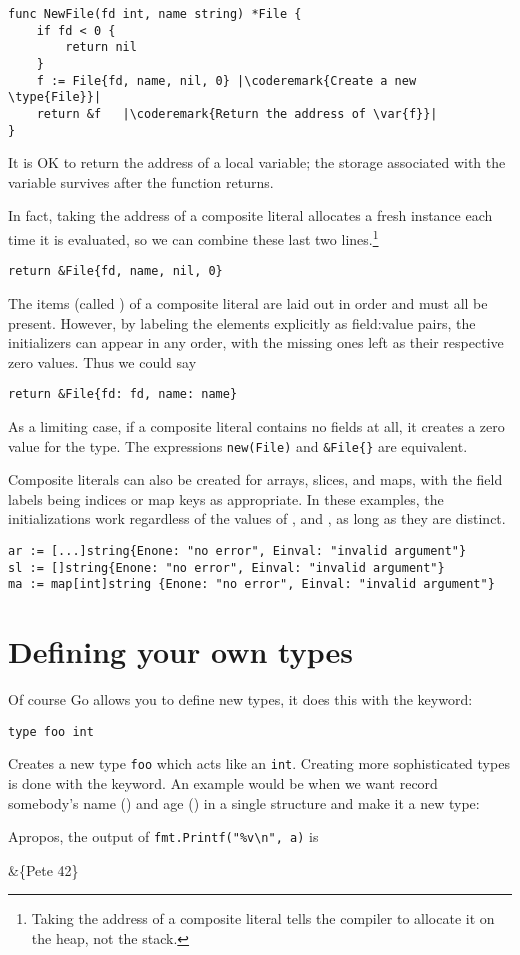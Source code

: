 \begin{lstlisting}
func NewFile(fd int, name string) *File {
    if fd < 0 {
        return nil
    }
    f := File{fd, name, nil, 0}	|\coderemark{Create a new \type{File}}|
    return &f	|\coderemark{Return the address of \var{f}}|
}
\end{lstlisting}
It is OK to return the address of a local variable;
the storage associated with the variable survives after the function
returns.

In fact, taking the address of a composite literal allocates a
fresh instance each time it is evaluated, so we can combine these last
two lines.\footnote{Taking the address of a composite literal tells the 
compiler to allocate it on the heap, not the stack.}
\begin{lstlisting}
return &File{fd, name, nil, 0}
\end{lstlisting}
The items (called ) of a composite 
literal are laid out in order and must all be
present. However, by labeling the elements explicitly as field:value
pairs, the initializers can appear in any order, with the missing ones
left as their respective zero values. Thus we could say

\begin{lstlisting}
return &File{fd: fd, name: name}
\end{lstlisting}
As a limiting case, if a composite literal contains no fields at all, it
creates a zero value for the type. The expressions
\lstinline{new(File)} and 
\lstinline|&File{}| are equivalent.

Composite literals can also be created for arrays, slices, and maps,
with the field labels being indices or map keys as appropriate. In these
examples, the initializations work regardless of the values of
, and , as long as they are distinct.
\begin{lstlisting}
ar := [...]string{Enone: "no error", Einval: "invalid argument"}
sl := []string{Enone: "no error", Einval: "invalid argument"}
ma := map[int]string {Enone: "no error", Einval: "invalid argument"}
\end{lstlisting}

\section{Defining your own types}
\label{sec:defining your own}
Of course Go allows you to define new types, it does this 
with the  keyword: 
\begin{lstlisting}
type foo int
\end{lstlisting}
Creates
a new type \lstinline{foo} which acts like an \lstinline{int}.
Creating more sophisticated types is done with the
keyword.
An example would be when we want record somebody's name ()
and age () in a single structure and make it a new type:

Apropos, the output of \lstinline{fmt.Printf("%v\n", a)} is 
\begin{display}
&\{Pete 42\}
\end{display}

